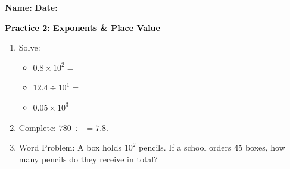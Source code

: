 \documentclass[12pt, letterpaper, fleqn]{article}
\newcommand{\blank}{\underline{\hspace{2.2cm}}}
\begin{document}
\textbf{Name:} \underline{\hspace{5cm}}
\hfill
\textbf{Date:} \underline{\hspace{3cm}}\\

\begin{tcolorbox}[colback=customteal!20]
    \large\textcolor{black}{\textbf{Practice 2: Exponents \& Place Value}}
\end{tcolorbox}
\begin{enumerate}[itemsep=3.5cm, leftmargin=0.6cm]
\item Solve:
  \begin{itemize}[itemsep=0.8cm]
    \item $0.8 \times 10^2 =$ \blank
    \item $12.4 \div 10^1 =$ \blank
    \item $0.05 \times 10^3 =$ \blank
  \end{itemize}
\item Complete: $780 \div$ \blank $= 7.8$.
\vspace{3cm}
\item Word Problem: A box holds $10^2$ pencils. If a school orders 45 boxes, how many pencils do they receive in total?
\end{enumerate}
\end{document}
